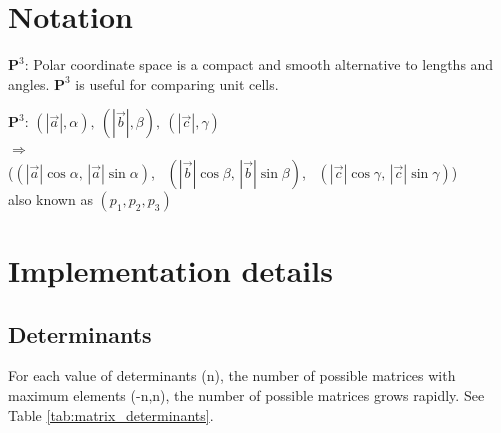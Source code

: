 \documentclass[preprint]{iucr}              %
\numberwithin{equation}{section}
\newcommand{\PIII}{\ensuremath{\mathbf{P}^{3}}}
\begin{document}
	\section{Notation}
	
\noindent \PIII{}: Polar coordinate space is a compact and smooth alternative to lengths and angles. \PIII{} is useful for comparing unit cells. \cite{andrews2026p3}

	\PIII{}: 
		$(|\vec{a}|,\alpha),\ (|\vec{b}|,\beta),\ (|\vec{c}|,\gamma)$\\
	$\Rightarrow$\\
	\hspace*{0.5cm}($(|\vec{a}|\cos\alpha,\, |\vec{a}|\sin\alpha)$,
	~$(|\vec{b}|\cos\beta,\, |\vec{b}|\sin\beta)$,
	~$(|\vec{c}|\cos\gamma,\, |\vec{c}|\sin\gamma)$)\\
	also known as $(p_1, p_2, p_3)$


\section{Implementation details}



\subsection{Determinants}

	For each value of determinants (n), the number of possible
	matrices with maximum elements (-n,n), the number of 
	possible matrices grows rapidly. See Table \ref{tab:matrix_determinants}.
	

\end{document}

